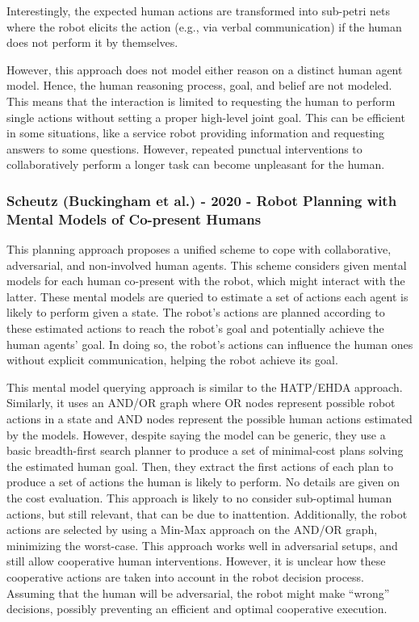 Interestingly, the expected human actions are transformed into sub-petri nets where the robot elicits the action (e.g., via verbal communication) if the human does not perform it by themselves. 

However, this approach does not model either reason on a distinct human agent model. Hence, the human reasoning process, goal, and belief are not modeled. This means that the interaction is limited to requesting the human to perform single actions without setting a proper high-level joint goal. This can be efficient in some situations, like a service robot providing information and requesting answers to some questions. However, repeated punctual interventions to collaboratively perform a longer task can become unpleasant for the human.

\subsubsection{Scheutz (Buckingham et al.) - 2020 - Robot Planning with Mental Models of Co-present Humans}

This planning approach proposes a unified scheme to cope with collaborative, adversarial, and non-involved human agents. This scheme considers given mental models for each human co-present with the robot, which might interact with the latter. These mental models are queried to estimate a set of actions each agent is likely to perform given a state. The robot's actions are planned according to these estimated actions to reach the robot's goal and potentially achieve the human agents' goal. In doing so, the robot's actions can influence the human ones without explicit communication, helping the robot achieve its goal.

This mental model querying approach is similar to the HATP/EHDA approach. Similarly, it uses an AND/OR graph where OR nodes represent possible robot actions in a state and AND nodes represent the possible human actions estimated by the models. However, despite saying the model can be generic, they use a basic breadth-first search planner to produce a set of minimal-cost plans solving the estimated human goal. Then, they extract the first actions of each plan to produce a set of actions the human is likely to perform. No details are given on the cost evaluation. This approach is likely to no consider sub-optimal human actions, but still relevant, that can be due to inattention. Additionally, the robot actions are selected by using a Min-Max approach on the AND/OR graph, minimizing the worst-case. This approach works well in adversarial setups, and still allow cooperative human interventions. However, it is unclear how these cooperative actions are taken into account in the robot decision process. Assuming that the human will be adversarial, the robot might make ``wrong'' decisions, possibly preventing an efficient and optimal cooperative execution.

